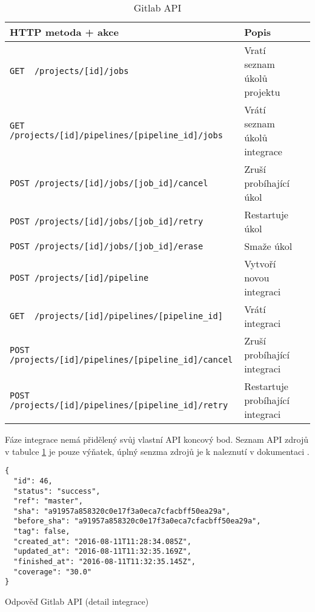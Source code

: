 \begin{table}[ht]
\centering
\fontsize{9.5}{11.5}\selectfont
\caption{Gitlab API}
\label{table:gitlab-api}
\begin{tabular}{|l|l|l|}
\hline
HTTP metoda + akce                                          & Popis \\ \hline
\verb|GET  /projects/[id]/jobs|                             & Vratí seznam úkolů projektu      \\ \hline
\verb|GET  /projects/[id]/pipelines/[pipeline_id]/jobs|     & Vrátí seznam úkolů integrace      \\ \hline
\verb|POST /projects/[id]/jobs/[job_id]/cancel|             & Zruší probíhající úkol      \\ \hline
\verb|POST /projects/[id]/jobs/[job_id]/retry|              & Restartuje úkol      \\ \hline
\verb|POST /projects/[id]/jobs/[job_id]/erase|              & Smaže úkol      \\ \hline
\verb|POST /projects/[id]/pipeline|                         & Vytvoří novou integraci      \\ \hline
\verb|GET  /projects/[id]/pipelines/[pipeline_id]|          & Vrátí integraci      \\ \hline
\verb|POST /projects/[id]/pipelines/[pipeline_id]/cancel|   & Zruší probíhající integraci      \\ \hline
\verb|POST /projects/[id]/pipelines/[pipeline_id]/retry|    & Restartuje probíhající integraci      \\ \hline
\end{tabular}
\end{table}

Fáze integrace nemá přidělený svůj vlastní API koncový bod.
Seznam API zdrojů v tabulce \ref{table:gitlab-api} je pouze výňatek, úplný senzma zdrojů je k naleznutí v dokumentaci \cite{gitlab_api}. 

\begin{listing}[ht]
\begin{verbatim}
{
  "id": 46,
  "status": "success",
  "ref": "master",
  "sha": "a91957a858320c0e17f3a0eca7cfacbff50ea29a",
  "before_sha": "a91957a858320c0e17f3a0eca7cfacbff50ea29a",
  "tag": false,
  "created_at": "2016-08-11T11:28:34.085Z",
  "updated_at": "2016-08-11T11:32:35.169Z",
  "finished_at": "2016-08-11T11:32:35.145Z",
  "coverage": "30.0"
}
\end{verbatim}
\label{code:gitlab-api}
\caption{Odpověď Gitlab API (detail integrace)}
\end{listing}


